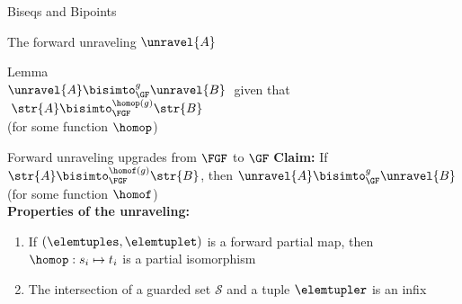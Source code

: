 \documentclass[aspectratio=169]{beamer}
\begin{document}

\begin{frame}{Biseqs and Bipoints}
  
\end{frame}

\begin{frame}{The forward unraveling $\unravel{A}$}
  
\end{frame}

\begin{frame}
  \begin{center}
    \Huge
    {Lemma} \\[0.5ex]
    \huge
    $\unravel{A} \bisimto_{\GF}^{g} \unravel{B}\;$ given that $\;\str{A} \bisimto_{\FGF}^{\homop(g)} \str{B}$ \\[0.2ex]
    \normalsize
    (for some function $\homop$)
  \end{center}
\end{frame}

\begin{frame}{Forward unraveling upgrades from $\FGF$ to $\GF$}
  \textbf{Claim:} If $\str{A} \bisimto_{\FGF}^{\homof(g)} \str{B}$, then $\unravel{A} \bisimto_{\GF}^{g} \unravel{B}$ (for some function $\homof$) \\[1.5em]

  \textbf{Properties of the unraveling:}\\[0.5em]
  \begin{enumerate}
    \item If $(\elemtuples, \elemtuplet)$ is a forward partial map, then $\homop: s_{i} \mapsto t_{i}$ is a partial isomorphism
          \vspace{0.5em}

          
    \item<2> The intersection of a guarded set $\mathcal{S}$ and a tuple $\elemtupler$ is an infix
          \vspace{0.5em}

          
  \end{enumerate}
\end{frame}
\end{document}
